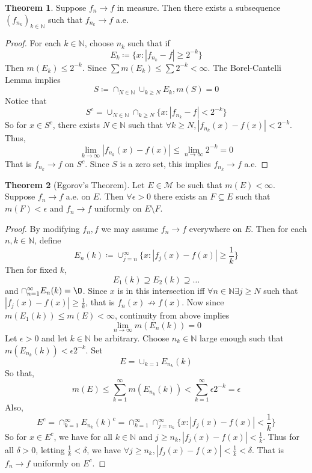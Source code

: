 \documentclass{article}
\theoremstyle{definition}
\newtheorem{theorem}{Theorem}[section]
\theoremstyle{remark}
\theoremstyle{remark}
\def\scriptm{{\mathcal M}}
\def\naturals{{\mathbb N}}
\begin{document}
\begin{theorem}
Suppose $f_n \to f$ in measure. Then there exists a subsequence $(f_{n_k})_{k\in\naturals}$ such that $f_{n_k}\to f$ a.e.
\end{theorem}
\begin{proof}
For each $k\in\naturals$, choose $n_k$ such that if 
$$E_k \coloneqq \{x: |f_{n_k} - f| \geq 2^{-k}\}$$
Then $m(E_k) \leq 2^{-k}$. Since $\sum m(E_k) \leq \sum 2^{-k} < \infty$. The Borel-Cantelli Lemma implies
$$S\coloneqq \cap_{N\in\naturals} \cup_{k\geq N} E_k, m(S) = 0$$
Notice that
$$S^c = \cup_{N\in\naturals} \cap_{k\geq N} \{x : |f_{n_k} - f| < 2^{-k}\}$$
So for $x \in S^c$, there exists $N \in\naturals$ such that $\forall k\geq N, |f_{n_k}(x) - f(x)| < 2^{-k}$. Thus,
$$\lim_{k\to\infty} |f_{n_k}(x) - f(x)| \leq \lim_{n\to\infty} 2^{-k} = 0$$
That is $f_{n_k}\to f$ on $S^c$. Since $S$ is a zero set, this implies $f_{n_k} \to f$ a.e.
\end{proof}
\begin{theorem}[Egorov's Theorem]
Let $E\in\scriptm$ be such that $m(E) < \infty$. Suppose $f_n \to f$ a.e. on $E$. Then $\forall \epsilon > 0$ there exists an $F \subseteq E$ such that $m(F) < \epsilon$ and $f_n\to f$ uniformly on $E\setminus F$.
\end{theorem}
\begin{proof}
By modifying $f_n, f$ we may assume $f_n \to f$ everywhere on $E$. Then for each $n, k \in \naturals$, define
$$ E_n(k) \coloneqq \cup_{j = n}^\infty \{x: |f_j(x) - f(x)| \geq \frac{1}{k}\}$$
Then for fixed $k$, 
$$ E_1(k) \supseteq E_2(k) \supseteq \dots$$
and $\cap_{n = 1}^\infty E_n(k) = \O$. Since $x$ is in this intersection iff $\forall n\in\naturals \exists j \geq N$ such that $|f_j(x) - f(x)| \geq \frac{1}{k}$, that is $f_n(x) \not\to f(x)$. Now since $m(E_1(k))\leq m(E) < \infty$, continuity from above implies
$$\lim_{n\to\infty} m(E_n(k)) = 0$$
Let $\epsilon > 0$ and let $k\in\naturals$ be arbitrary. Choose $n_k \in \naturals$ large enough such that $m(E_{n_k}(k)) < \epsilon 2^{-k}$. Set
$$E = \cup_{k=1} E_{n_k}(k)$$
So that,
$$ m(E) \leq \sum_{k=1}^\infty m(E_{n_k}(k)) < \sum_{k=1}^\infty \epsilon 2^{-k} = \epsilon$$
Also,
$$ E^c = \cap_{k=1}^\infty E_{n_k}(k)^c = \cap_{k=1}^\infty \cap_{j=n_k}^\infty \{x: |f_j(x) - f(x)| < \frac{1}{k}\}$$
So for $x \in E^c$, we have for all $k\in\naturals$ and $j\geq n_k, |f_j(x) - f(x)| < \frac{1}{k}$. Thus for all $\delta > 0$, letting $\frac{1}{k} < \delta$, we have $\forall j\geq n_k, |f_j(x) - f(x)| < \frac{1}{k} < \delta$. That is $f_n \to f$ uniformly on $E^c$. 
\end{proof}
\end{document}
